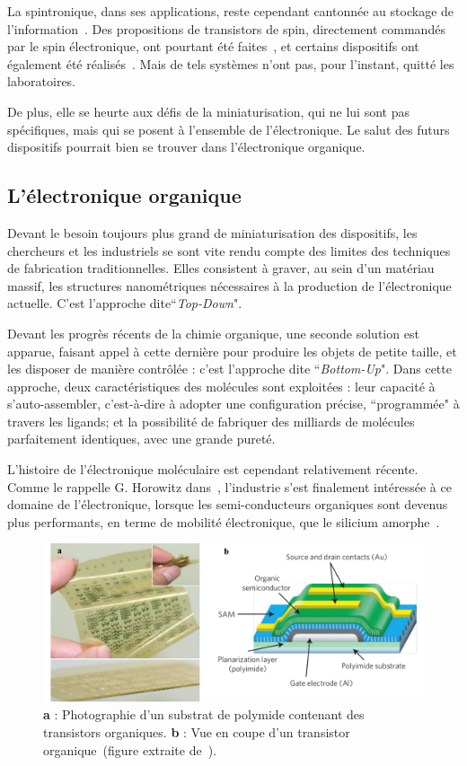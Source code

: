 La spintronique, dans ses applications, reste cependant cantonnée au stockage de  l'information~\cite{Awschalom2007}. Des propositions de transistors de spin, directement commandés par le spin électronique, ont pourtant été faites~\cite{Datta1990}, et certains dispositifs ont également été réalisés~\cite{Johnson1996,Huang2007}. Mais de tels systèmes n'ont pas, pour l'instant, quitté les laboratoires.

De plus, elle se heurte aux défis de la miniaturisation, qui ne lui sont pas spécifiques, mais qui se posent à l'ensemble de l'électronique. Le salut des futurs dispositifs pourrait bien se trouver dans l'électronique organique.

\subsection{L'électronique organique}
Devant le besoin toujours plus grand de miniaturisation des dispositifs, les chercheurs et les industriels se sont vite rendu compte des limites des techniques de fabrication traditionnelles. Elles consistent à graver, au sein d'un matériau massif, les structures nanométriques nécessaires à la production de l'électronique actuelle. C'est l'approche dite``\textit{Top-Down}".

Devant les progrès récents de la chimie organique, une seconde solution est apparue, faisant appel à cette dernière  pour produire les objets de petite taille, et les disposer de manière contrôlée : c'est l'approche dite ``\textit{Bottom-Up}". Dans cette approche, deux caractéristiques des molécules sont exploitées : leur capacité à s'auto-assembler, c'est-à-dire à adopter une configuration précise, ``programmée" à travers les ligands; et la possibilité de fabriquer des milliards de molécules parfaitement identiques, avec une grande pureté. 

L'histoire de l'électronique moléculaire est cependant relativement récente. Comme le rappelle G. Horowitz dans~\cite{Klauk2007}, l'industrie s'est finalement intéressée à ce domaine de l'électronique, lorsque les semi-conducteurs organiques sont devenus plus performants, en terme de mobilité électronique, que le silicium amorphe~\cite{Lin1997}.
\begin{figure}
\centering \includegraphics[scale=0.45]{Spintronique/MolecularElec/MolecularElec.pdf}
\caption{\textbf{a} : Photographie d'un substrat de polymide contenant des transistors organiques. \textbf{b} : Vue en coupe d'un transistor organique~(figure extraite de~\cite{Sekitani2010}).}
\label{MolecularElec}
\end{figure}


